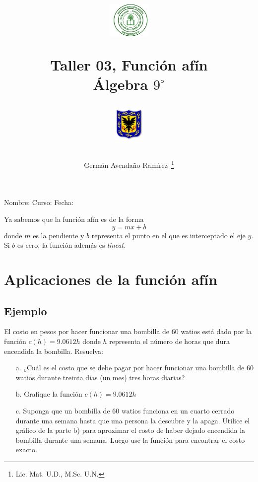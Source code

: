 \documentclass[letterpaper,11pt,twoside]{article}
\author{Germ\'an Avenda\~no Ram\'irez~\thanks{Lic. Mat. U.D., M.Sc. U.N.}}
\title{\begin{minipage}{.2\textwidth}
\includegraphics[height=1.75cm]{Images/logo-colegio.png}\end{minipage}
\begin{minipage}{.55\textwidth}
\begin{center}
Taller 03, Función afín\\
Álgebra $9^{\circ}$
\end{center}
\end{minipage}\hfill
\begin{minipage}{.2\textwidth}
\includegraphics[height=1.75cm]{Images/logo-sed.png} 
\end{minipage}}
\date{}
\begin{document}
\maketitle
Nombre: \hrulefill Curso: \underline{\hspace*{44pt}} Fecha: \underline{\hspace*{2.5cm}}
\begin{multicols}{2}
 Ya sabemos que la función afín es de la forma
 \[y=mx+b\]
 donde $m$ es la pendiente y $b$ representa el punto en el que es interceptado el eje $y$. Si $b$ es cero, la función además es \emph{lineal}.
 \section*{Aplicaciones de la función afín}
 \subsection*{Ejemplo}
 El costo en pesos por hacer funcionar una bombilla de 60 watios está dado por la función $c(h)=9.0612h$ donde $h$ representa el número de horas que dura encendida la bombilla. Resuelva:
 \begin{itemize}
 \item[a.] ¿Cuál es el costo que se debe pagar por hacer funcionar una bombilla de 60 watios durante treinta días (un mes) tres horas diarias?
 \item[b.] Grafique la función $c(h)=9.0612h$
 \item[c.] Suponga que un bombilla de 60 watios funciona en un cuarto cerrado durante una semana hasta que una persona la descubre y la apaga. Utilice el gráfico de la parte b) para aproximar el costo de haber dejado encendida la bombilla durante una semana. Luego use la función para encontrar el costo exacto.
  \end{itemize}

\end{multicols}
\end{document}
